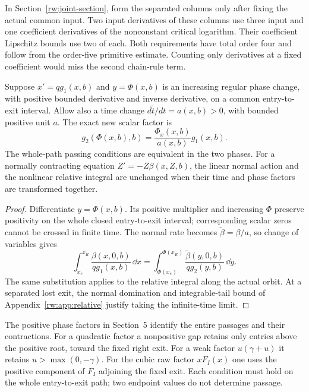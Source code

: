 In Section~\ref{rw:joint-section}, form the separated columns only
after fixing the actual common input. Two input derivatives of these
columns use three input and one coefficient derivatives of the
nonconstant critical logarithm. Their coefficient Lipschitz bounds use
two of each. Both requirements have total order four and follow from
the order-five primitive estimate. Counting only derivatives at a fixed
coefficient would miss the second chain-rule term.

\begin{lemma}
\label{rw:app:scalar-phase}
Suppose $x'=qg_1(x,b)$ and $y=\Phi(x,b)$ is an increasing regular
phase change, with positive bounded derivative and inverse derivative,
on a common entry-to-exit interval. Allow also a time change
$d\widetilde t/dt=a(x,b)>0$, with bounded positive unit $a$.
The exact new scalar factor is
\[
 g_2(\Phi(x,b),b)=\frac{\Phi_x(x,b)}{a(x,b)}g_1(x,b).
\]
The whole-path passing conditions are equivalent in the two phases.
For a normally contracting equation $Z'=-Z\beta(x,Z,b)$, the
linear normal action and the nonlinear relative integral are unchanged
when their time and phase factors are transformed together.
\end{lemma}
\begin{proof}
Differentiate $y=\Phi(x,b)$. Its positive multiplier and increasing
$\Phi$ preserve positivity on the whole closed entry-to-exit interval;
corresponding scalar zeros cannot be crossed in finite time. The normal
rate becomes $\widetilde\beta=\beta/a$, so change of variables gives
\[
 \int_{x_e}^{x_R}\frac{\beta(x,0,b)}{qg_1(x,b)}\,\dd x
 =\int_{\Phi(x_e)}^{\Phi(x_R)}
       \frac{\widetilde\beta(y,0,b)}{qg_2(y,b)}\,\dd y.
\]
The same substitution applies to the relative integral along the
actual orbit. At a separated lost exit, the normal domination and
integrable-tail bound of Appendix~\ref{rw:app:relative} justify taking
the infinite-time limit.
\end{proof}

The positive phase factors in Section~5 identify the entire passages
and their contractions.
For a quadratic factor a nonpositive gap retains only entries above
the positive root, toward the fixed right exit. For a weak factor
$u(\gamma+u)$ it retains $u>\max(0,-\gamma)$. For the cubic raw
factor $xF_I(x)$ one uses the positive component of $F_I$ adjoining
the fixed exit. Each condition must hold on the whole entry-to-exit
path; two endpoint values do not determine passage.

